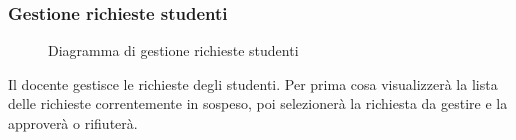 \documentclass[a4paper, titlepage]{article}
\begin{document}
\subsubsection{Gestione richieste studenti}
\begin{figure}[H]
	\centering
	\noindent{}
	\caption{Diagramma di gestione richieste studenti}
\end{figure}
Il docente gestisce le richieste degli studenti. Per prima cosa visualizzerà la lista delle richieste correntemente in sospeso, poi selezionerà la richiesta da gestire e la approverà o rifiuterà. 

\newpage
\end{document}
